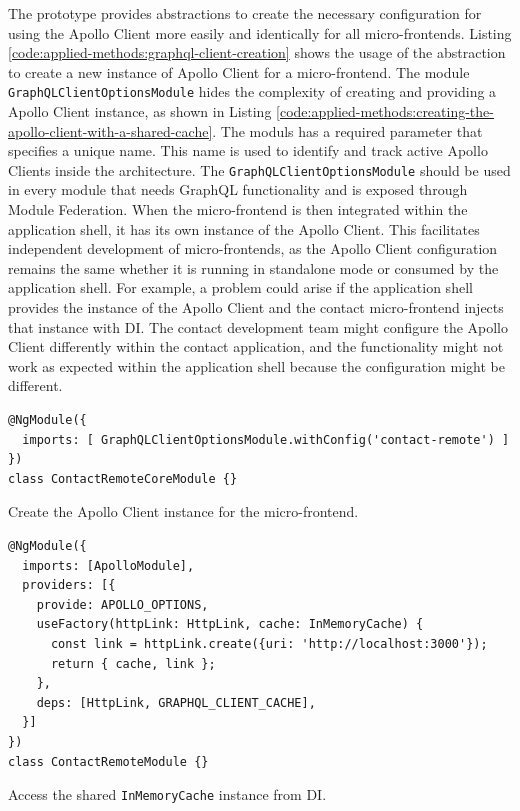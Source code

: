 \noindent The prototype provides abstractions to create the necessary configuration for using the Apollo Client more easily and identically for all micro-frontends. Listing \ref{code:applied-methods:graphql-client-creation} shows the usage of the abstraction to create a new instance of Apollo Client for a micro-frontend. The module \texttt{GraphQLClientOptionsModule} hides the complexity of creating and providing a Apollo Client instance, as shown in Listing \ref{code:applied-methods:creating-the-apollo-client-with-a-shared-cache}. The moduls has a required parameter that specifies a unique name. This name is used to identify and track active Apollo Clients inside the architecture. The \texttt{GraphQLClientOptionsModule} should be used in every module that needs GraphQL functionality and is exposed through Module Federation. When the micro-frontend is then integrated within the application shell, it has its own instance of the Apollo Client. This facilitates independent development of micro-frontends, as the Apollo Client configuration remains the same whether it is running in standalone mode or consumed by the application shell. For example, a problem could arise if the application shell provides the instance of the Apollo Client and the contact micro-frontend injects that instance with \ac{DI}. The contact development team might configure the Apollo Client differently within the contact application, and the functionality might not work as expected within the application shell because the configuration might be different.

\ifshowListings
\begin{listing}[H]
  \begin{verbatim}
@NgModule({
  imports: [ GraphQLClientOptionsModule.withConfig('contact-remote') ]
})
class ContactRemoteCoreModule {}
  \end{verbatim}
  \caption{Create the Apollo Client instance for the micro-frontend.}\label{code:applied-methods:graphql-client-creation}
  \end{listing}
\fi

\ifshowListings
\begin{listing}[H]
\begin{verbatim}
@NgModule({
  imports: [ApolloModule],
  providers: [{
    provide: APOLLO_OPTIONS,
    useFactory(httpLink: HttpLink, cache: InMemoryCache) {
      const link = httpLink.create({uri: 'http://localhost:3000'});
      return { cache, link };
    },
    deps: [HttpLink, GRAPHQL_CLIENT_CACHE],
  }]
})
class ContactRemoteModule {}
  \end{verbatim}
\caption{Access the shared \texttt{InMemoryCache} instance from \ac{DI}.}\label{code:applied-methods:creating-the-apollo-client-with-a-shared-cache}
\end{listing}
\fi

